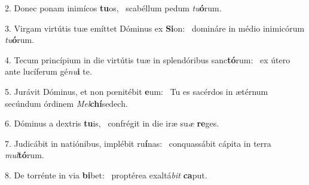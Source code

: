 2. Donec ponam inimícos \textbf{tu}os, \ast\  scabéllum pedum \textit{tu}\textbf{ó}rum.\

3. Virgam virtútis tuæ emíttet Dóminus ex \textbf{Si}on: \ast\  domináre in médio inimicórum \textit{tu}\textbf{ó}rum.\

4. Tecum princípium in die virtútis tuæ in splendóribus sanc\textbf{tó}rum: \ast\  ex útero ante lucíferum gé\textit{nu}\textbf{i} te.\

5. Jurávit Dóminus, et non pœnitébit \textbf{e}um: \ast\  Tu es sacérdos in ætérnum secúndum órdinem \textit{Mel}\textbf{chí}sedech.\

6. Dóminus a dextris \textbf{tu}is, \ast\  confrégit in die iræ su\textit{æ} \textbf{re}ges.\

7. Judicábit in natiónibus, implébit ru\textbf{í}nas: \ast\  conquassábit cápita in terra \textit{mul}\textbf{tó}rum.\

8. De torrénte in via \textbf{bi}bet: \ast\  proptérea exaltá\textit{bit} \textbf{ca}put.\

